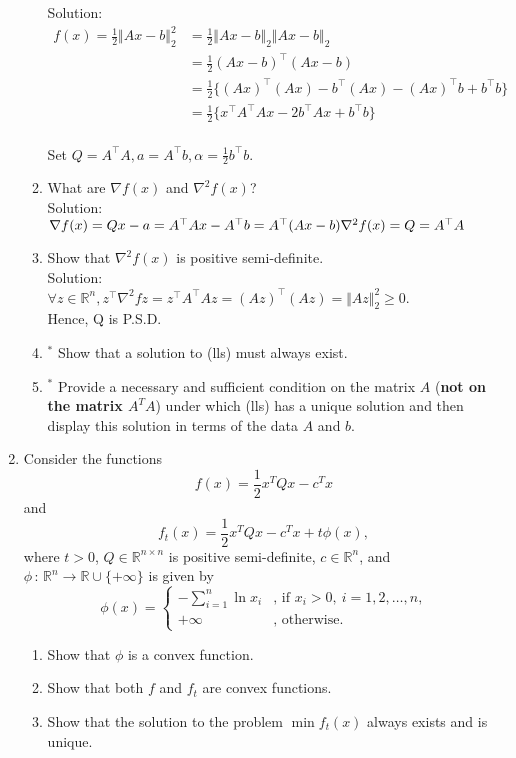 \documentclass[12pt]{amsart}
\newcommand{\norm}[1]{\Vert #1 \Vert}
\newcommand{\R}{{\mathbb{R}}}
\newcommand{\grad}{\nabla}
\newcommand{\tpose}[1]{#1^{\scriptscriptstyle T}}
\begin{document}
\begin{enumerate}
\begin{enumerate}
\noindent
Solution:\\
\begin{align*}
f(x) = \frac{1}{2} \norm{Ax-b}^2_2 &= \frac{1}{2}\norm{Ax-b}_2 \norm{Ax-b}_2 \\
&= \frac{1}{2} (Ax-b)^\top (Ax-b) \\
&= \frac{1}{2} \{(Ax)^\top (Ax) - b^\top (Ax) - (Ax)^\top b + b^\top b \} \\
&= \frac{1}{2} \{x^\top A^\top A x - 2 b^\top Ax + b^\top b \} 
\end{align*} \\

Set $Q = A^\top A, a = A^\top b, \alpha = \frac{1}{2} b^\top b$. \\

\item What are $\grad f(x)$ and $\grad^2 f(x)$? \\

\noindent
Solution: \\
$\grad f(x) = Qx - a = A^\top Ax - A^\top b = A^\top (Ax-b) \\
\grad^2 f(x) = Q = A^\top A$ \\

\item Show that $\grad^2 f(x)$ is positive semi-definite. \\

\noindent
Solution: \\
$ \forall z \in \mathbb{R}^n, z^\top \grad^2 f z = z^\top A^\top A z = (Az)^\top (Az) = \norm{Az}^2_2 \geq 0$.  \\
Hence, Q is P.S.D.  \\

\item$^*$ Show that a solution to (lls) must always exist.
\item$^*$ Provide a necessary and sufficient condition on the matrix
$A$ ({\bf not on the matrix $A^TA$}) under which (lls)
has a unique solution and then display this solution in terms
of the data $A$ and $b$.
\end{enumerate}
\item
Consider the functions
$$f(x)=\frac{1}{2} \tpose{x} Q x -\tpose{c}x $$
and
$$
f_t(x)=\frac{1}{2} \tpose{x} Q x -\tpose{c}x +t\phi(x),
$$
where $t>0$, $Q\in\R^{n\times n}$ is positive semi-definite,
$c\in\R^n$, and $\phi\, :\, \R^n\rightarrow\R\cup\{+\infty\}$
is given by
$$
\phi(x)=\left\{\begin{array}{ll}
-\sum_{i=1}^n\ln x_i&\mbox{, if $x_i> 0,\ i=1,2,\dots ,n$,}\\
+\infty&\mbox{, otherwise.}\end{array}\right.
$$
\begin{enumerate}
\item
Show that $\phi$ is a convex function.
\item
Show that both $f$ and $f_t$ are convex functions.
\item
Show that the solution to the problem $\min f_t(x)$ always
exists and is unique.
\end{enumerate}




\end{enumerate}
\end{document}
